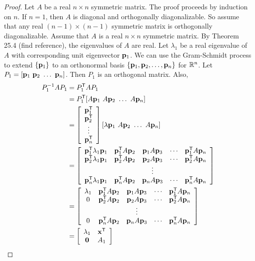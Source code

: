\begin{proof} Let $A$ be a real $n \times n$ symmetric matrix. The proof proceeds by induction on $n$. If $n = 1$, then $A$ is diagonal and orthogonally diagonalizable. So assume that any real $(n-1) \times (n-1)$ symmetric matrix is orthogonally diagonalizable. Assume that $A$ is a real $n \times n$ symmetric matrix. By Theorem 25.4 (find reference), the eigenvalues of $A$ are real. Let $\lambda_1$ be a real eigenvalue of $A$ with corresponding unit eigenvector $\mathbf{p}_1$. We can use the Gram-Schmidt process to extend $\{\mathbf{p}_1\}$ to an orthonormal basis $\{\mathbf{p}_1, \mathbf{p}_2, \ldots, \mathbf{p}_n\}$ for $\mathbb{R}^n$. Let $P_1 = [\mathbf{p}_1 \ \mathbf{p}_2 \ \ldots \ \mathbf{p}_n]$. Then $P_1$ is an orthogonal matrix. Also,
\begin{align*}
P_1^{-1}AP_1 &= P_1^{\tr}AP_1 \\
	&= P_1^{\tr} [A\vp_1 \ A\vp_2 \ \ldots \ A\vp_n] \\
	&= \left[ \begin{array}{c} \vp_1^{\tr} \\ \vp_2^{\tr} \\ \vdots \\ \vp_n^{\tr} \end{array} \right]  [\lambda \vp_1 \ A\vp_2 \ \ldots \ A\vp_n] \\
	&= \left[ \begin{array}{ccccc} 
	\vp_1^{\tr} \lambda_1 \vp_1 & \vp_1^{\tr} A\vp_2 & \vp_1 A\vp_3 & \cdots & \vp_1^{\tr} A \vp_n \\
	 \vp_2^{\tr} \lambda_1 \vp_1 & \vp_2^{\tr} A\vp_2 & \vp_2 A\vp_3 &\cdots & \vp_2^{\tr} A \vp_n \\
	 					&	& \vdots 	& & \\
	\vp_n^{\tr} \lambda_1 \vp_1 & \vp_n^{\tr} A\vp_2 & \vp_n A\vp_3 &\cdots & \vp_n^{\tr} A \vp_n 
	\end{array} \right] \\
	&= \left[ \begin{array}{ccccc} 
	\lambda_1& \vp_1^{\tr} A\vp_2 & \vp_1 A\vp_3 & \cdots & \vp_1^{\tr} A \vp_n \\
	 0 & \vp_2^{\tr} A\vp_2 & \vp_2 A\vp_3 &\cdots & \vp_2^{\tr} A \vp_n \\
	 					&	& \vdots 	& & \\
	0 & \vp_n^{\tr} A\vp_2 & \vp_n A\vp_3 &\cdots & \vp_n^{\tr} A \vp_n 
	\end{array} \right] \\
	 &= \left[ \begin{array}{cc} \lambda_1&\vx^{\tr} \\ \vzero & A_1 \end{array} \right]

\end{align*}
\end{proof}
